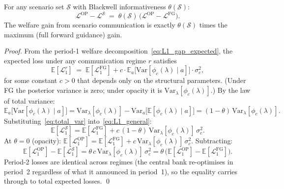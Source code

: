 \begin{proposition}
\label{prop:scenario}
For any scenario set $\mathcal{S}$ with Blackwell informativeness $\theta(\mathcal{S})$:
\begin{equation}
  \mathcal{L}^{\mathrm{OP}} - \mathcal{L}^{\mathcal{S}}
  \;=\;
  \theta(\mathcal{S})\,
  \bigl(\mathcal{L}^{\mathrm{OP}} - \mathcal{L}^{\mathrm{FG}}\bigr).
  \label{eq:scenario_gain}
\end{equation}
The welfare gain from scenario communication is exactly $\theta(\mathcal{S})$ times
the maximum (full forward guidance) gain.
\end{proposition}

\begin{proof}
From the period-1 welfare decomposition~\eqref{eq:L1_gap_expected}, the expected
loss under any communication regime $r$ satisfies
\begin{equation}
  \mathbb{E}[\mathcal{L}_1^r]
  \;=\;
  \mathbb{E}[\mathcal{L}_1^{\mathrm{FG}}]
  + c \cdot \mathbb{E}_a\bigl[\mathrm{Var}[\phi_c(\lambda)\mid a]\bigr]\cdot\sigma_c^2,
  \label{eq:L1_general}
\end{equation}
for some constant $c > 0$ that depends only on the structural parameters. (Under FG
the posterior variance is zero; under opacity it is $\mathrm{Var}_\lambda[\phi_c(\lambda)]$.)
By the law of total variance:
\begin{equation}
  \mathbb{E}_a\bigl[\mathrm{Var}[\phi_c(\lambda)\mid a]\bigr]
  = \mathrm{Var}_\lambda[\phi_c(\lambda)]
    - \mathrm{Var}_a\bigl[\mathbb{E}[\phi_c(\lambda)\mid a]\bigr]
  = (1-\theta)\,\mathrm{Var}_\lambda[\phi_c(\lambda)].
  \label{eq:total_var}
\end{equation}
Substituting~\eqref{eq:total_var} into~\eqref{eq:L1_general}:
\begin{equation}
  \mathbb{E}[\mathcal{L}_1^{\mathcal{S}}]
  = \mathbb{E}[\mathcal{L}_1^{\mathrm{FG}}]
    + c\,(1-\theta)\,\mathrm{Var}_\lambda[\phi_c(\lambda)]\,\sigma_c^2.
\end{equation}
At $\theta = 0$ (opacity): $\mathbb{E}[\mathcal{L}_1^{\mathrm{OP}}] =
\mathbb{E}[\mathcal{L}_1^{\mathrm{FG}}] + c\,\mathrm{Var}_\lambda[\phi_c(\lambda)]\,\sigma_c^2$.
Subtracting:
\begin{equation*}
  \mathbb{E}[\mathcal{L}_1^{\mathrm{OP}}] - \mathbb{E}[\mathcal{L}_1^{\mathcal{S}}]
  = \theta\,c\,\mathrm{Var}_\lambda[\phi_c(\lambda)]\,\sigma_c^2
  = \theta\,\bigl(\mathbb{E}[\mathcal{L}_1^{\mathrm{OP}}]
                  - \mathbb{E}[\mathcal{L}_1^{\mathrm{FG}}]\bigr).
\end{equation*}
Period-2 losses are identical across regimes (the central bank re-optimises in
period~2 regardless of what it announced in period~1), so the equality carries
through to total expected losses. \qed
\end{proof}

